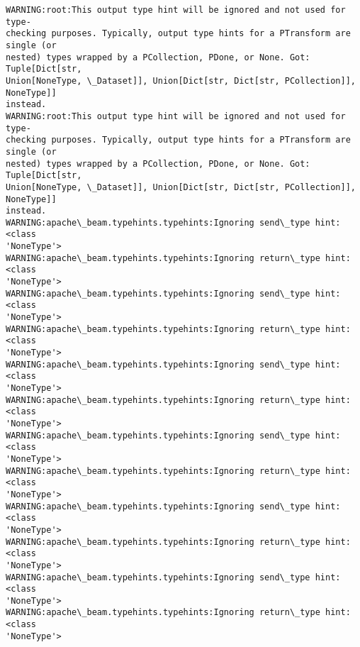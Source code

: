 \documentclass[11pt]{article}
\begin{document}
    \begin{Verbatim}[commandchars=\\\{\}]
WARNING:root:This output type hint will be ignored and not used for type-
checking purposes. Typically, output type hints for a PTransform are single (or
nested) types wrapped by a PCollection, PDone, or None. Got: Tuple[Dict[str,
Union[NoneType, \_Dataset]], Union[Dict[str, Dict[str, PCollection]], NoneType]]
instead.
WARNING:root:This output type hint will be ignored and not used for type-
checking purposes. Typically, output type hints for a PTransform are single (or
nested) types wrapped by a PCollection, PDone, or None. Got: Tuple[Dict[str,
Union[NoneType, \_Dataset]], Union[Dict[str, Dict[str, PCollection]], NoneType]]
instead.
WARNING:apache\_beam.typehints.typehints:Ignoring send\_type hint: <class
'NoneType'>
WARNING:apache\_beam.typehints.typehints:Ignoring return\_type hint: <class
'NoneType'>
WARNING:apache\_beam.typehints.typehints:Ignoring send\_type hint: <class
'NoneType'>
WARNING:apache\_beam.typehints.typehints:Ignoring return\_type hint: <class
'NoneType'>
WARNING:apache\_beam.typehints.typehints:Ignoring send\_type hint: <class
'NoneType'>
WARNING:apache\_beam.typehints.typehints:Ignoring return\_type hint: <class
'NoneType'>
WARNING:apache\_beam.typehints.typehints:Ignoring send\_type hint: <class
'NoneType'>
WARNING:apache\_beam.typehints.typehints:Ignoring return\_type hint: <class
'NoneType'>
WARNING:apache\_beam.typehints.typehints:Ignoring send\_type hint: <class
'NoneType'>
WARNING:apache\_beam.typehints.typehints:Ignoring return\_type hint: <class
'NoneType'>
WARNING:apache\_beam.typehints.typehints:Ignoring send\_type hint: <class
'NoneType'>
WARNING:apache\_beam.typehints.typehints:Ignoring return\_type hint: <class
'NoneType'>
    \end{Verbatim}
\end{document}

